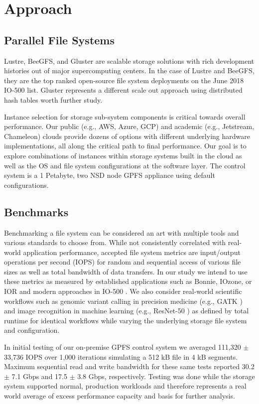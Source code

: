 \documentclass[conference]{IEEEtran}
\begin{document}
\section{Approach}

\subsection{Parallel File Systems}
Lustre, BeeGFS, and Gluster are scalable storage solutions with rich development histories out of major supercomputing centers. In the case of Lustre and BeeGFS, they are the top ranked open-source file system deployments on the June 2018 IO-500 list. Gluster represents a different scale out approach using distributed hash tables worth further study.

Instance selection for storage sub-system components is critical towards overall performance. Our public (e.g., AWS, Azure, GCP) and academic (e.g., Jetstream, Chameleon) clouds provide dozens of options with different underlying hardware implementations, all along the critical path to final performance. Our goal is to explore combinations of instances within storage systems built in the cloud as well as the OS and file system configurations at the software layer. The control system is a 1 Petabyte, two NSD node GPFS appliance using default configurations.

\subsection{Benchmarks}
Benchmarking a file system can be considered an art with multiple tools and various standards to choose from. While not consistently correlated with real-world application performance, accepted file system metrics are input/output operations per second (IOPS) for random and sequential access of various file sizes as well as total bandwidth of data transfers. In our study we intend to use these metrics as measured by established applications such as Bonnie, IOzone, or IOR and modern approaches in IO-500 \cite{kunkel}. We also consider real-world scientific workflows such as genomic variant calling in precision medicine (e.g., GATK \cite{mckenna}) and image recognition in machine learning (e.g., ResNet-50 \cite{he}) as defined by total runtime for identical workflows while varying the underlying storage file system and configuration.

In initial testing of our on-premise GPFS control system we averaged 111,320 $\pm$ 33,736 IOPS over 1,000 iterations simulating a 512 kB file in 4 kB segments. Maximum sequential read and write bandwidth for these same tests reported 30.2 $\pm$ 7.1 Gbps and 17.5 $\pm$ 3.8 Gbps, respectively. Testing was done while the storage system supported normal, production workloads and therefore represents a real world average of excess performance capacity and basis for further analysis.
\end{document}
